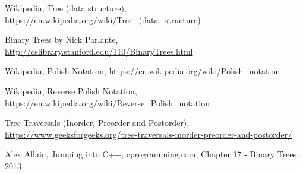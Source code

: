 \begin{thebibliography}{9}
Wikipedia, Tree (data structure), \href{https://en.wikipedia.org/wiki/Tree_(data_structure)}{https://en.wikipedia.org/wiki/Tree\_(data\_structure)}

Binary Trees by Nick Parlante, \href{http://cslibrary.stanford.edu/110/BinaryTrees.html}{http://cslibrary.stanford.edu/110/BinaryTrees.html}

Wikipedia, Polish Notation, \href{https://en.wikipedia.org/wiki/Polish_notation}{https://en.wikipedia.org/wiki/Polish\_notation}

Wikipedia, Reverse Polish Notation, \href{https://en.wikipedia.org/wiki/Reverse_Polish_notation}{https://en.wikipedia.org/wiki/Reverse\_Polish\_notation}

Tree Traversals (Inorder, Preorder and Postorder), \href{https://www.geeksforgeeks.org/tree-traversals-inorder-preorder-and-postorder/}{https://www.geeksforgeeks.org/tree-traversals-inorder-preorder-and-postorder/}

Alex Allain, Jumping into C++, cprogramming.com, Chapter 17 - Binary Trees, 2013

\end{thebibliography}

